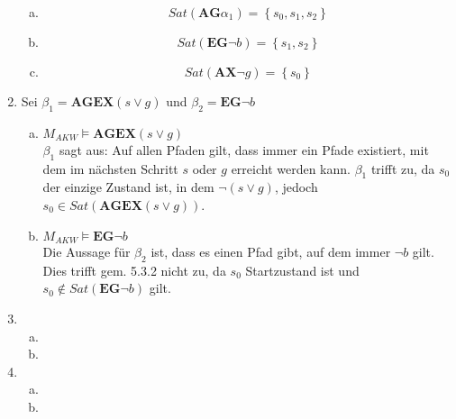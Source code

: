 \documentclass[a4paper]{scrartcl}
\begin{document}
\begin{enumerate}
\begin{enumerate}[(a)]
            \item
                \begin{equation}
                    Sat(\textbf{AG}\alpha_1) = \left\{ s_0, s_1, s_2 \right\}
                \end{equation}

            \item
                \begin{equation}
                    Sat(\textbf{EG} \lnot b) = \left\{ s_1, s_2 \right\}
                \end{equation}

            \item
                \begin{equation}
                    Sat(\textbf{AX} \lnot g) = \left\{ s_0 \right\}
                \end{equation}

        \end{enumerate}

    \item Sei $\beta_1=\textbf{AGEX}(s\vee g)$ und $\beta_2=\textbf{EG}\neg b$
        \begin{enumerate}[(a)]
            \item $M_{AKW}\models\textbf{AGEX}(s\vee g)$ \\
                $\beta_1$ sagt aus: Auf allen Pfaden gilt, dass immer ein Pfade
                existiert, mit dem im nächsten Schritt $s$ oder $g$ erreicht
                werden kann.
                $\beta_1$ trifft zu, da $s_0$ der einzige Zustand ist, in dem
                $\neg(s\vee g)$, jedoch $s_0\in Sat(\textbf{AGEX}(s\vee g))$.
		\item $M_{AKW}\models\textbf{EG}\neg b$ \\
            Die Aussage für $\beta_2$ ist, dass es einen Pfad gibt, auf dem
            immer $\neg b$ gilt.
            Dies trifft gem. 5.3.2 nicht zu, da $s_0$ Startzustand ist und
            $s_0\notin Sat(\textbf{EG}\neg b)$ gilt.
        \end{enumerate}

    \item
        \begin{enumerate}[(a)]
            \item
                
            \item
                
        \end{enumerate}

    \item
        \begin{enumerate}[(a)]
            \item
                
            \item
                
        \end{enumerate}

\end{enumerate}
\end{document}
